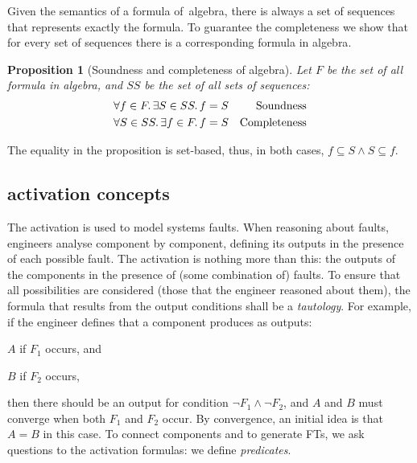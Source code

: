 \documentclass[12pt,openright,twoside,a4paper,oldfontcommands,english,brazil,final]{abntex2}
\theoremstyle{theo}
\newtheorem{proposition}{Proposition}[chapter]
\begin{document}

Given the semantics of a formula of~\ac{algebra}, there is always a set of sequences that represents exactly the formula.
To guarantee the completeness we show that for every set of sequences there is a corresponding formula in \ac{algebra}.

\begin{proposition}[Soundness and completeness of \ac{algebra}]
Let $F$ be the set of all formula in \ac{algebra}, and $SS$ be the set of all sets of sequences:
%
\begin{subequations}
  \begin{align}
    \forall f \in F \ldotp \exists S \in SS \ldotp f & = S & \text{Soundness}\\
    \forall S \in SS \ldotp \exists f \in F \ldotp f & = S & \text {Completeness}
  \end{align}
\end{subequations}
\end{proposition}
%
The equality in the proposition is set-based, thus, in both cases, $f \subseteq S \land S \subseteq f$.

\subsection{\acs*{activation} concepts}
\label{sec:activation}

The \acf{activation} is used to model systems faults.
When reasoning about faults, engineers analyse component by component, defining its outputs in the presence of each possible fault.
The \ac{activation} is nothing more than this: the outputs of the components in the presence of (some combination of) faults.
To ensure that all possibilities are considered (those that the engineer reasoned about them), the formula that results from the output conditions shall be a \emph{tautology}.
For example, if the engineer defines that a component produces as outputs:
\begin{alineasinline}
  \item $A$ if $F_1$ occurs, and
  \item $B$ if $F_2$ occurs,
\end{alineasinline}
then there should be an output for condition $\lnot F_1 \land \lnot F_2$, and $A$ and $B$ must converge when both $F_1$ and $F_2$ occur.
By convergence, an initial idea is that $A = B$ in this case.
To connect components and to generate \acp{FT}, we ask questions to the \ac{activation} formulas: we define \emph{predicates}.
\end{document}
